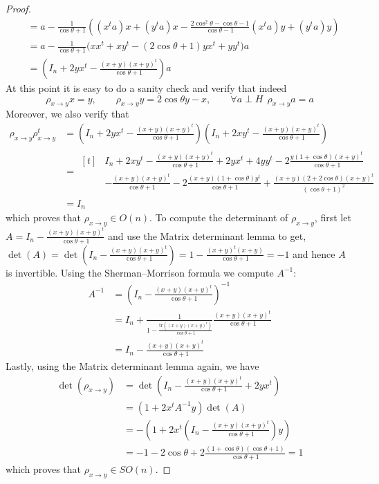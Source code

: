 \begin{proof}
\begin{align*}
&=a-\frac{1}{\cos\theta+1}\left((x^ta)x+(y^ta)x-\frac{2\cos^2\theta-\cos\theta-1}{\cos\theta-1}(x^ta)y+(y^ta)y\right)\\
&=a-\frac{1}{\cos\theta+1}\big(xx^t+xy^t-(2\cos\theta+1)yx^t+yy^t\big)a\\
&=\left(I_n+2yx^t-\frac{(x+y)(x+y)^t}{\cos\theta+1}\right)a
\end{align*}
\endgroup
At this point it is easy to do a sanity check and verify that indeed
\[\rho_{x\to y}x=y,\qquad\rho_{x\to y}y=2\cos\theta y-x,\qquad\forall a\perp H\ \ \rho_{x\to y}a=a\]
Moreover, we also verify that
\begin{align*}
\rho_{x\to y}\rho_{x\to y}^t&=\left(I_n+2yx^t-\frac{(x+y)(x+y)^t}{\cos\theta+1}\right)\left(I_n+2xy^t-\frac{(x+y)(x+y)^t}{\cos\theta+1}\right)\\
&=\begin{aligned}[t]&I_n+2xy^t-\frac{(x+y)(x+y)^t}{\cos\theta+1}+2yx^t+4yy^t-2\frac{y(1+\cos\theta)(x+y)^t}{\cos\theta+1}\\
&-\frac{(x+y)(x+y)^t}{\cos\theta+1}-2\frac{(x+y)(1+\cos\theta)y^t}{\cos\theta+1}+\frac{(x+y)(2+2\cos\theta)(x+y)^t}{(\cos\theta+1)^2}\end{aligned}\\
&=I_n
\end{align*}
which proves that $\rho_{x\to y}\in O(n)$. To compute the determinant of $\rho_{x\to y}$, first let $A=I_n-\frac{(x+y)(x+y)^t}{\cos\theta+1}$ and use the Matrix determinant lemma to get,
$\det(A)=\det\left(I_n-\frac{(x+y)(x+y)^t}{\cos\theta+1}\right)=1-\frac{(x+y)^t(x+y)}{\cos\theta+1}=-1$
and hence $A$ is invertible. Using the Sherman–Morrison formula we compute $A^{-1}$:
\begin{align*}
A^{-1}&=\left(I_n-\frac{(x+y)(x+y)^t}{\cos\theta+1}\right)^{-1}\\
&=I_n+\frac{1}{1-\frac{\mathrm{tr}\left((x+y)(x+y)^t\right)}{\cos\theta+1}}\frac{(x+y)(x+y)^t}{\cos\theta+1}\\
&=I_n-\frac{(x+y)(x+y)^t}{\cos\theta+1}
\end{align*}
Lastly, using the Matrix determinant lemma again, we have
\begin{align*}
\det(\rho_{x\to y})&=\det\left(I_n-\frac{(x+y)(x+y)^t}{\cos\theta+1}+2yx^t\right)\\
&=\left(1+2x^tA^{-1}y\right)\det(A)\\
&=-\left(1+2x^t\left(I_n-\frac{(x+y)(x+y)^t}{\cos\theta+1}\right)y\right)\\
&=-1-2\cos\theta+2\frac{(1+\cos\theta)(\cos\theta+1)}{\cos\theta+1}=1
\end{align*}
which proves that $\rho_{x\to y}\in SO(n)$.
\end{proof}

